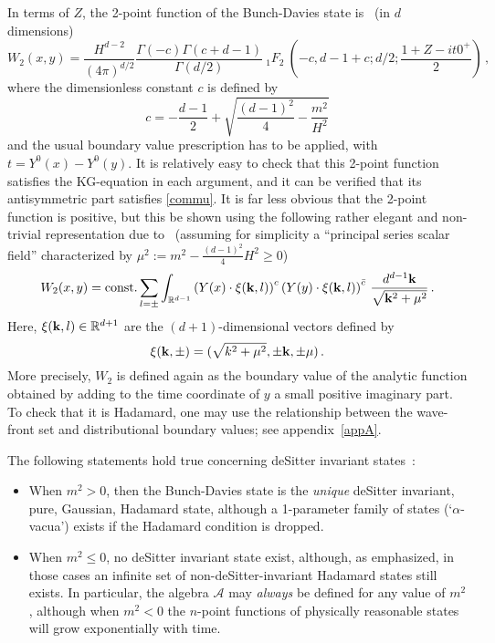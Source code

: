 \documentclass[12pt]{article}
\newcommand{\RR}{\mathbb{R}}
\newcommand{\eA}{\mathscr{A}}
\theoremstyle{plain}
\theoremstyle{definition}
\def\ben{\begin{equation}}
\def\een{\end{equation}}
\begin{document}
In terms of $Z$, the 2-point function of the Bunch-Davies state is~\cite{allen,bros1,bros2}
(in $d$ dimensions)
\ben\label{vac}
W_2(x,y) = \frac{H^{d-2}}{(4\pi)^{d/2}} \frac{\Gamma(-c)\Gamma(c+d-1)}{\Gamma(d/2)} \ {}_1 F_2 \ \left(-c, d-1+c; d/2; \frac{1+Z-it0^+}{2} \right) \, ,
\een
where the dimensionless constant $c$ is defined by
\ben
c = -\frac{d-1}{2} + \sqrt{\frac{(d-1)^2}{4} - \frac{m^2}{H^2}}
\een
and the usual boundary value prescription
has to be applied, with $t=Y^0(x)-Y^0(y)$. It is relatively easy to check
that this 2-point function satisfies the KG-equation in each argument, and it can be verified that its antisymmetric part satisfies \eqref{commu}. It is far less obvious that the 2-point function is positive,
but this be shown using the following rather elegant and non-trivial representation due to~\cite{bros1,bros2}
(assuming for simplicity a ``principal series scalar field''  characterized by $\mu^2 := m^2 - \frac{(d-1)^2}{4} H^2 \ge 0$)
\ben \label{posrep}
W_2(x,y) = {\rm const.}\sum_{l=\pm} \int_{\RR^{d-1}}
\left( Y(x) \cdot \xi({\bf k}, l)
\right)^{c}
\left( Y(y) \cdot \xi({\bf k}, l)
\right)^{\bar c} \, \frac{d^{d-1} {\bf k}}{\sqrt{{\bf k}^2 + \mu^2}} \, .
\een
Here, $\xi({\bf k}, l) \in \RR^{d+1}$ are the
$(d+1)$-dimensional vectors defined by
\ben
\xi({\bf k}, \pm) = (\sqrt{k^2 + \mu^2}, \pm {\bf k}, \pm \mu) \, .
\een
More precisely, $W_2$ is defined again as
the boundary value of the analytic function
obtained by adding to the time coordinate
of $y$ a small positive imaginary part. To check that it is Hadamard,
one may use the relationship between the wave-front set and
distributional boundary values; see appendix~\ref{appA}.

The following statements hold true concerning deSitter invariant states~\cite{allen}:

\begin{itemize}
\item When $m^2>0$, then the Bunch-Davies state is the {\em unique} deSitter invariant, pure, Gaussian,
Hadamard state, although a 1-parameter family of states (`$\alpha$-vacua') exists if the Hadamard condition is dropped.

\item When $m^2 \le 0$, no deSitter invariant state exist, although, as emphasized, in those cases
an infinite set of non-deSitter-invariant Hadamard states still exists. In particular, the algebra $\eA$ may {\em always}
be defined for any value of $m^2$, although when $m^2 < 0$ the $n$-point functions of physically reasonable
states will grow exponentially with time.
\end{itemize}
\end{document}
